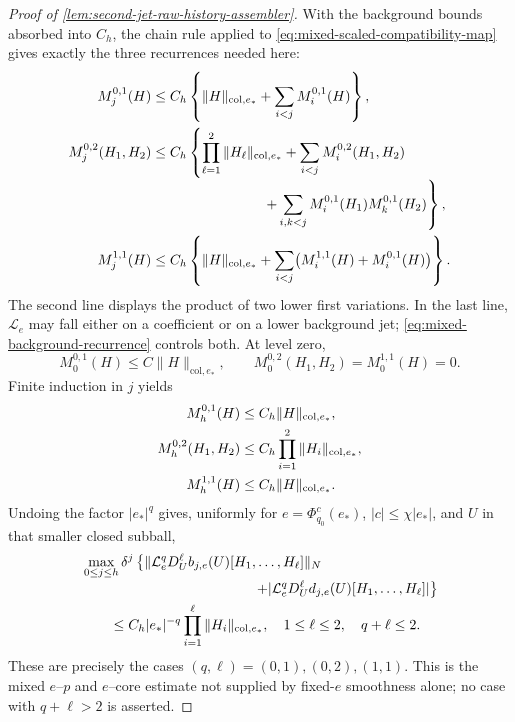 \begin{proof}[Proof of
\cref{lem:second-jet-raw-history-assembler}]
With the background bounds absorbed into \(C_h\), the chain rule applied
to \cref{eq:mixed-scaled-compatibility-map} gives exactly the three
recurrences needed here:
\begin{align}
 M_j^{0,1}(H)
 &\le C_h\left\{\|H\|_{\mathrm{col},e_*}
   +\sum_{i<j}M_i^{0,1}(H)\right\},\notag\\
 M_j^{0,2}(H_1,H_2)
 &\le C_h\left\{
   \prod_{\ell=1}^2\|H_\ell\|_{\mathrm{col},e_*}
   +\sum_{i<j}M_i^{0,2}(H_1,H_2)\right.\notag\\[-1mm]
 &\hspace{28mm}\left.
   +\sum_{i,k<j}
      M_i^{0,1}(H_1)M_k^{0,1}(H_2)\right\},\notag\\
 M_j^{1,1}(H)
 &\le C_h\left\{\|H\|_{\mathrm{col},e_*}
   +\sum_{i<j}
      \bigl(M_i^{1,1}(H)+M_i^{0,1}(H)\bigr)\right\}.
                                                               \label{eq:mixed-data-recurrences}
\end{align}
The second line displays the product of two lower first variations.  In the
last line, \(\mathcal L_e\) may fall either on a coefficient or on a lower
background jet; \cref{eq:mixed-background-recurrence} controls both.
At level zero,
\[
 M_0^{0,1}(H)\le C\|H\|_{\mathrm{col},e_*},\qquad
 M_0^{0,2}(H_1,H_2)=M_0^{1,1}(H)=0.
\]
Finite induction in \(j\) yields
\begin{align}
 M_h^{0,1}(H)&\le C_h\|H\|_{\mathrm{col},e_*},\notag\\
 M_h^{0,2}(H_1,H_2)
 &\le C_h\prod_{i=1}^2\|H_i\|_{\mathrm{col},e_*},\notag\\
 M_h^{1,1}(H)&\le C_h\|H\|_{\mathrm{col},e_*}.     \label{eq:mixed-majorants-closed}
\end{align}
Undoing the factor \(|e_*|^q\) gives, uniformly for
\(e=\Phi_{q_0}^c(e_*)\), \(|c|\le\chi|e_*|\), and \(U\) in that smaller
closed subball,
\begin{align}
 &\max_{0\le j\le h}\delta^j
 \left\{
  \|\mathcal L_e^qD_U^\ell b_{j,e}(U)
            [H_1,\ldots,H_\ell]\|_N\right.\notag\\[-1mm]
 &\hspace{43mm}\left.
  +|\mathcal L_e^qD_U^\ell d_{j,e}(U)
            [H_1,\ldots,H_\ell]|
 \right\}\notag\\
 &\qquad\le C_h|e_*|^{-q}
       \prod_{i=1}^{\ell}\|H_i\|_{\mathrm{col},e_*},
 \quad 1\le\ell\le2,\quad q+\ell\le2.             \label{eq:mixed-endpoint-collar-jet-bound}
\end{align}
These are precisely the cases
\((q,\ell)=(0,1),(0,2),(1,1)\).  This is the mixed
\(e\)--\(p\) and \(e\)--core estimate not supplied by fixed-\(e\)
smoothness alone; no case with \(q+\ell>2\) is asserted.


\end{proof}
